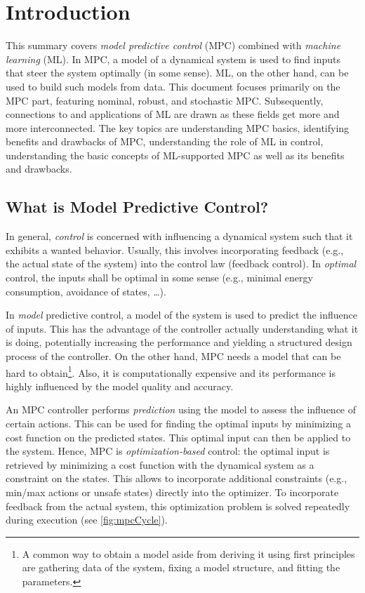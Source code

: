 \renewcommand{\mat}[1]{\bm{\mathrm{#1}}}
\newcommand{\transposed}{{\!\top}}

\chapter{Introduction}
	This summary covers \emph{model predictive control} (MPC) combined with \emph{machine learning} (ML). In MPC, a model of a dynamical system is used to find inputs that steer the system optimally (in some sense). ML, on the other hand, can be used to build such models from data. This document focuses primarily on the MPC part, featuring nominal, robust, and stochastic MPC. Subsequently, connections to and applications of ML are drawn as these fields get more and more interconnected. The key topics are understanding MPC basics, identifying benefits and drawbacks of MPC, understanding the role of ML in control, understanding the basic concepts of ML-supported MPC as well as its benefits and drawbacks.

	\section{What is Model Predictive Control?}
		In general, \emph{control} is concerned with influencing a dynamical system such that it exhibits a wanted behavior. Usually, this involves incorporating feedback (e.g., the actual state of the system) into the control law (feedback control). In \emph{optimal} control, the inputs shall be optimal in some sense (e.g., minimal energy consumption, avoidance of states, \dots).

		In \emph{model} predictive control, a model of the system is used to predict the influence of inputs. This has the advantage of the controller actually understanding what it is doing, potentially increasing the performance and yielding a structured design process of the controller. On the other hand, MPC needs a model that can be hard to obtain\footnote{A common way to obtain a model aside from deriving it using first principles are gathering data of the system, fixing a model structure, and fitting the parameters.}. Also, it is computationally expensive and its  performance is highly influenced by the model quality and accuracy.

		An MPC controller performs \emph{prediction} using the model to assess the influence of certain actions. This can be used for finding the optimal inputs by minimizing a cost function on the predicted states. This optimal input can then be applied to the system. Hence, MPC is \emph{optimization-based} control: the optimal input is retrieved by minimizing a cost function with the dynamical system as a constraint on the states. This allows to incorporate additional constraints (e.g., min/max actions or unsafe states) directly into the optimizer. To incorporate feedback from the actual system, this optimization problem is solved repeatedly during execution (see \autoref{fig:mpcCycle}).

